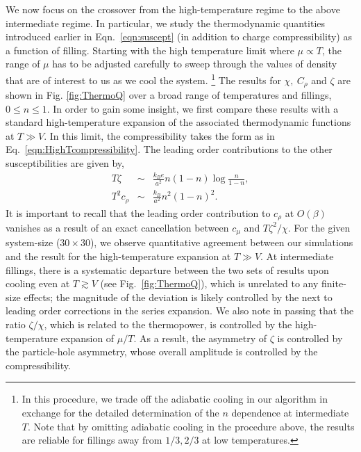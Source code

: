 \documentclass[aps,prx,onecolumn,amsmath,nofootinbib,amssymb,11pt]{revtex4-1}
\def \beq {\begin{eqnarray}}
\def \eeq {\end{eqnarray}}
\begin{document}
{We now focus on the crossover from the high-temperature regime to the above intermediate regime. In particular, we study the thermodynamic quantities introduced earlier in Eqn.~\ref{eqn:suscept} (in addition to charge compressibility) as a function of filling. Starting with the high temperature limit where $\mu\propto T$, the range of $\mu$ has to be adjusted carefully to sweep through the values of density that are of interest to us as we cool the system. \footnote{\textsf{In this procedure, we trade off the adiabatic cooling in our algorithm in exchange for the detailed determination of the $n$ dependence at intermediate $T$. Note that by omitting adiabatic cooling in the procedure above, the results are reliable for fillings away from $1/3, 2/3$ at low temperatures.}} The results for $\chi,~C_\rho$ and $\zeta$ are shown in Fig. \ref{fig:ThermoQ} over a broad range of temperatures and fillings, $0\leq n\leq1$. In order to gain some insight, we first compare these results with a standard high-temperature expansion of the associated thermodynamic functions at $T\gg V$. In this limit, the compressibility takes the form as in Eq.~\ref{eqn:HighTcompressibility}. The leading order contributions to the other susceptibilities are given by, 
\begin{subequations}
\beq
T \zeta & \sim& \frac{k_B e}{a^2} n (1-n) \log \frac{n}{1-n},\\
T^2 c_\rho &\sim& \frac{k_B}{a^2} n^2 (1-n)^2.
\eeq
\label{eqn:susceptHighT}
\end{subequations}
It is important to recall that the leading order contribution to $c_\rho$ at $O(\beta)$ vanishes as a result of an exact cancellation between $c_\mu$ and $T\zeta^2/\chi$. For the given system-size ($30\times30$), we observe quantitative agreement between our simulations and the result for the high-temperature expansion at $T\gg V$. At intermediate fillings, there is a systematic departure between the two sets of results upon cooling even at $T\gtrsim V$ (see Fig.~\ref{fig:ThermoQ}), which is unrelated to any finite-size effects; the magnitude of the deviation is likely controlled by the next to leading order corrections in the series expansion. We also note in passing that the ratio $\zeta /\chi$, which is related to the thermopower, is controlled by the high-temperature expansion of $\mu/T$. As a result, the asymmetry of $\zeta$ is controlled by the particle-hole asymmetry, whose overall amplitude is controlled by the compressibility. 


}
\end{document}
